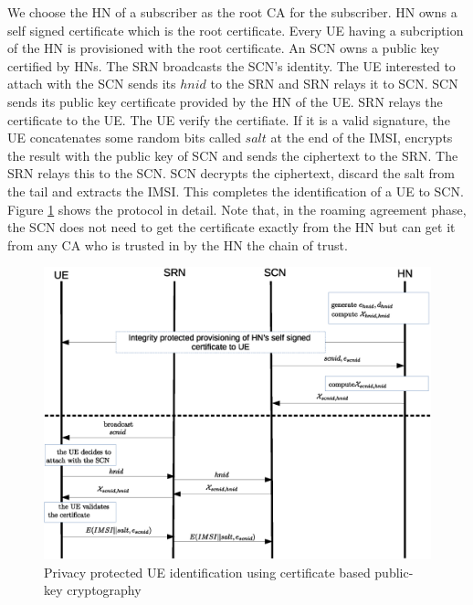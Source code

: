 \documentclass[lnicst,sechang,a4paper]{svmultln}
\begin{document}
We choose the HN of a subscriber as the root CA for the subscriber. HN owns a self signed certificate which is the root certificate. Every UE having a subcription of the HN is provisioned with the root certificate. An SCN owns a public key certified by HNs. The SRN broadcasts the SCN's identity. The UE interested to attach with the SCN sends its $hnid$ to the SRN and SRN relays it to SCN. SCN sends its public key certificate provided by the HN of the UE. SRN relays the certificate to the UE. The UE verify the certifiate. If it is a valid signature, the UE concatenates some random bits called $salt$ at the end of the IMSI, encrypts the result with the public key of SCN and sends the ciphertext to the SRN. The SRN relays this to the SCN. SCN decrypts the ciphertext, discard the salt from the tail and extracts the IMSI. This completes the identification of a UE to SCN. Figure \ref{fig:solution_certificate} shows the protocol in detail. Note that, in the roaming agreement phase, the SCN does not need to get the certificate exactly from the HN but can get it from any CA who is trusted in by the HN the chain of trust.


\begin{figure}
\begin{center}
  \includegraphics[width=.98\textwidth]{public_key_variation1.eps}
\caption{Privacy protected UE identification using certificate based public-key cryptography}
\label{fig:solution_certificate}       %
\end{center}
\end{figure}
\end{document}
